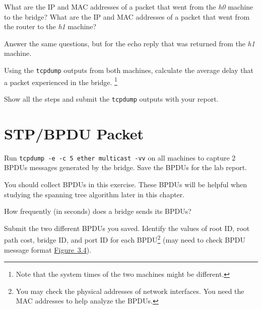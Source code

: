 \documentclass{../UTNetLab}
\begin{document}
    \begin{report}
        \item What are the IP and MAC addresses of a packet that went from the \textit{h0} machine to the bridge?
            What are the IP and MAC addresses of a packet that went from the router to the \textit{h1} machine?

        \item Answer the same questions, but for the echo reply that was returned from the \textit{h1} machine.
        
        \item Using the \lstinline{tcpdump} outputs from both machines, calculate the average delay that a packet experienced in the bridge.
            \footnote{Note that the system times of the two machines might be different.}
    \end{report}

    Show all the steps and submit the \lstinline{tcpdump} outputs with your report.

\section{STP/BPDU Packet}
    Run \lstinline{tcpdump -e -c 5 ether multicast -vv} on all machines to capture 2 BPDUs messages generated by the bridge.
    Save the BPDUs for the lab report.

    

    You should collect BPDUs in this exercise.
    These BPDUs will be helpful when studying the spanning tree algorithm later in this chapter.

    \begin{report}
        \item How frequently (in seconds) does a bridge sends its BPDUs?

        \item Submit the two different BPDUs you saved.
            Identify the values of root ID, root path cost, bridge ID, and port ID for each BPDU\footnote{You may check the physical addresses of network interfaces.
            You need the MAC addresses to help analyze the BPDUs.} (may need to check BPDU message format \hyperref[fig:3.4]{Figure~3.4}).
    \end{report}
\end{document}
